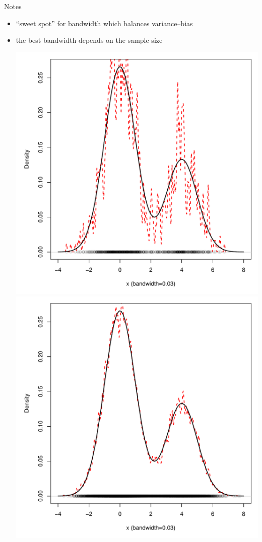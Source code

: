 \documentclass[12pt]{beamer}
\begin{document}
\begin{frame}{Notes}
  \begin{itemize}
  \item ``sweet spot'' for bandwidth which balances variance--bias
  \item the best bandwidth depends on the sample size
    \begin{center}
      \includegraphics[scale=0.2]{figs/density1_1.pdf}
      \includegraphics[scale=0.2]{figs/density1_largen.pdf}\\

\end{center}
\end{itemize}
\end{frame}
\end{document}
